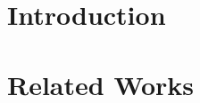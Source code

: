 \documentclass[master]{NTHUthesis}
\begin{document}
\makecover


\begin{abstractZH}


\end{abstractZH}


\begin{abstractEN}

\end{abstractEN}


\begin{acknowledgementsZH}

\end{acknowledgementsZH}

% 

\maketoc




\chapter{Introduction}


\chapter{Related Works}

\end{document}
